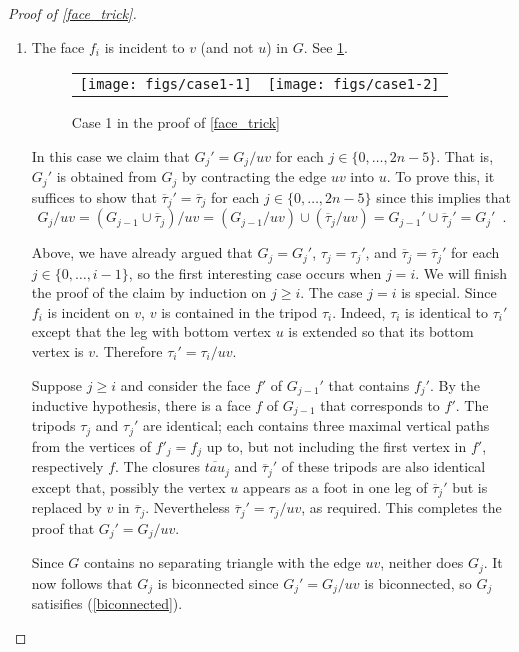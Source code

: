 \documentclass{patmorin}
\begin{document}
\begin{proof}[Proof of \cref{face_trick}]
  \begin{enumerate}
    \item The face $f_i$ is incident to $v$ (and not $u$) in $G$. See \cref{replacement}.
    \begin{figure}
      \begin{center}
        \begin{tabular}{cc}
          \texttt{[image: figs/case1-1]} & \texttt{[image: figs/case1-2]}
        \end{tabular}
      \end{center}
      \caption{Case 1 in the proof of \cref{face_trick}}
      \label{replacement}
    \end{figure}

    In this case we claim that $G_j'=G_j/uv$ for each $j\in\{0,\ldots,2n-5\}$. That is, $G_j'$ is obtained from $G_j$ by contracting the edge $uv$ into $u$.  To prove this, it suffices to show that $\overline{\tau}_j'=\overline{\tau}_j$ for each $j\in\{0,\ldots,2n-5\}$ since this implies that
    \[
      G_j/uv = (G_{j-1}\cup\overline{\tau}_j)/uv=(G_{j-1}/uv) \cup (\overline{\tau}_j/uv) = G_{j-1}'\cup \overline{\tau}_j' = G_j' \enspace .
    \]

    Above, we have already argued that $G_j=G_j'$, $\tau_j=\tau_j'$, and $\overline{\tau}_j=\overline{\tau}_j'$ for each $j\in\{0,\ldots,i-1\}$, so the first interesting case occurs when $j=i$.  We will finish the proof of the claim by induction on $j\ge i$. The case $j=i$ is special.  Since $f_i$ is incident on $v$, $v$ is contained in the tripod $\tau_i$.  Indeed, $\tau_i$ is identical to $\tau_i'$ except that the leg with bottom vertex $u$ is extended so that its bottom vertex is $v$. Therefore $\tau_i'=\tau_i/uv$.

    Suppose $j\ge i$ and consider the face $f'$ of $G_{j-1}'$ that contains $f_j'$.  By the inductive hypothesis, there is a face $f$ of $G_{j-1}$ that corresponds to $f'$. The tripods $\tau_j$ and $\tau_j'$ are identical; each contains three maximal vertical paths from the vertices of $f'_j=f_j$ up to, but not including the first vertex in $f'$, respectively $f$.  The closures $\overline{tau}_j$ and $\overline{\tau}_j'$ of these tripods are also identical except that, possibly the vertex $u$ appears as a foot in one leg of $\overline{\tau}_j'$ but is replaced by $v$ in $\overline{\tau}_j$.  Nevertheless $\overline{\tau}_j'=\tau_j/uv$, as required.  This completes the proof that $G_j'=G_j/uv$.

    Since $G$ contains no separating triangle with the edge $uv$, neither does $G_j$.  It now follows that $G_j$ is biconnected since $G_j'=G_j/uv$ is biconnected, so $G_j$ satisifies (\ref{biconnected}).


\end{enumerate}
\end{proof}
\end{document}
